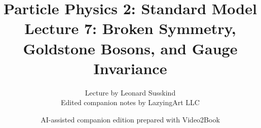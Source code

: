 \documentclass[11pt,oneside]{book}
\begin{document}
\frontmatter
\title{Particle Physics 2: Standard Model\\Lecture 7: Broken Symmetry, Goldstone Bosons, and Gauge Invariance}
\author{Lecture by Leonard Susskind\\Edited companion notes by LazyingArt LLC}
\date{AI-assisted companion edition prepared with Video2Book}
\maketitle
\clearpage
\mainmatter

\end{document}
